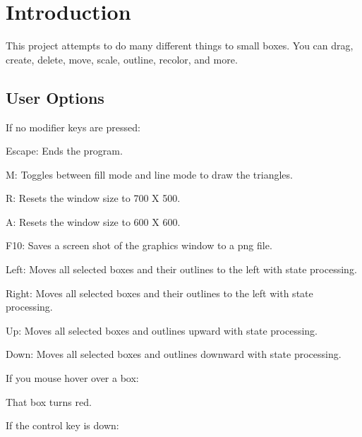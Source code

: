 \hypertarget{index_intro}{}\section{Introduction}\label{index_intro}
This project attempts to do many different things to small boxes. You can drag, create, delete, move, scale, outline, recolor, and more.\hypertarget{index_options}{}\subsection{User Options}\label{index_options}
If no modifier keys are pressed\+:


\begin{DoxyItemize}
\item Escape\+: Ends the program.
\item M\+: Toggles between fill mode and line mode to draw the triangles.
\item R\+: Resets the window size to 700 X 500.
\item A\+: Resets the window size to 600 X 600.
\item F10\+: Saves a screen shot of the graphics window to a png file.
\item Left\+: Moves all selected boxes and their outlines to the left with state processing.
\item Right\+: Moves all selected boxes and their outlines to the left with state processing.
\item Up\+: Moves all selected boxes and outlines upward with state processing.
\item Down\+: Moves all selected boxes and outlines downward with state processing.
\end{DoxyItemize}

If you mouse hover over a box\+:
\begin{DoxyItemize}
\item That box turns red.
\end{DoxyItemize}

If the control key is down\+:


